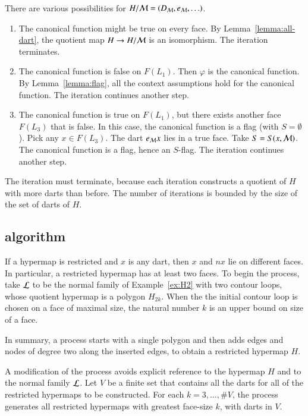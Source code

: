 There are various possibilities for $H/{\cal M} = (D_{\cal M},e_{\cal M},\ldots)$.
\begin{enumerate}
\item  The canonical function might be true on every face.  By Lemma~\ref{lemma:all-dart}, the quotient map $H\to H/{\cal M}$ is an isomorphism.  The iteration terminates.
\item The canonical function is false on $F(L_1)$.  Then $\varphi$ is the canonical function.  By Lemma~\ref{lemma:flag}, all the context assumptions hold for the canonical function.  The iteration continues another step.
\item The canonical function is true on $F(L_1)$, but there exists another face $F(L_3)$ that is false.  In this case, the canonical function is a flag (with $S=\emptyset$).  Pick any $x\in F(L_3)$.  The dart $e_{\cal M} x$ lies in a true face.  Take $S=S(x,{\cal M})$.  The canonical function is a flag, hence an $S$-flag.  The iteration continues another step.
\end{enumerate}

The iteration must terminate, because each iteration constructs a quotient of $H$ with more darts than before.  The number of iterations is bounded by the size of the set of darts of $H$.

\subsection{algorithm}

If a hypermap is restricted and $x$ is any dart, then $x$ and $n x$ lie
on different faces.  In particular, a restricted hypermap has at least two faces.
To begin the process,  take ${\cal L}$ to be the normal family of Example~\ref{ex:H2} with two contour loops, whose quotient hypermap is a polygon $H_{2k}$.  When the the initial contour loop is chosen on a face of maximal size,  the natural number $k$ is  an upper bound on size of a face.

In summary,  a process  starts with a single polygon and then adds edges and nodes of degree two along the inserted edges,  to obtain a restricted hypermap $H$.

A modification of the process avoids explicit reference to the hypermap $H$ and to the normal family ${\cal L}$.   Let $V$ be a finite set that contains all the darts for all of the restricted hypermaps to be constructed.  For each $k=3,\ldots,\# V$, the process generates all restricted hypermaps with greatest face-size $k$, with darts in $V$.  

